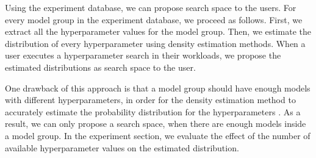 Using the experiment database, we can propose search space to the users.
For every model group in the experiment database, we proceed as follows.
First, we extract all the hyperparameter values for the model group.
Then, we estimate the distribution of every hyperparameter using density estimation methods.
When a user executes a hyperparameter search in their workloads, we propose the estimated distributions as search space to the user.

One drawback of this approach is that a model group should have enough models with different hyperparameters, in order for the density estimation method to accurately estimate the probability distribution for the hyperparameters \cite{silverman2018density}.
As a result, we can only propose a search space, when there are enough models inside a model group.
In the experiment section, we evaluate the effect of the number of available hyperparameter values on the estimated distribution.




